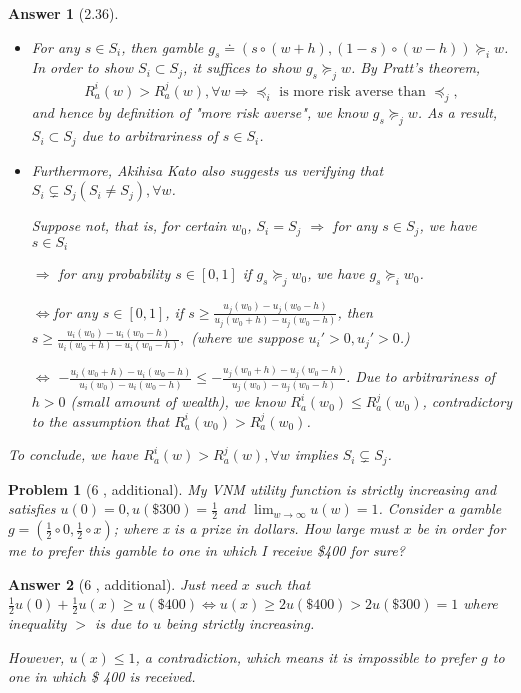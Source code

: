 \documentclass{article}
\newtheorem*{ans}{Answer}
\newtheorem*{prob}{{\bf Problem}}
\newcommand{\1}{{\bf 1}}
\newcommand{\0}{{\mathbf{0}}}
\newcommand{\<}{\langle}
\renewcommand{\>}{\rangle}
\newcommand{\dps}{\displaystyle}
\begin{document}
\begin{ans}[2.36] 
	\begin{itemize}
		\item For any $s \in S_i$, then gamble $g_s \doteq \left( s\circ (w+h), (1-s)\circ (w-h) \right) \succeq_i w$. In order to show $S_i \subset S_j$, it suffices to show $g_s \succeq_j w$. By Pratt's theorem, 
	$$R_a^i(w) > R_a^j(w), \forall w \Rightarrow \preceq_i\text{ is more risk averse than }\preceq_j,$$
	and hence by definition of "more risk averse", we know $g_s \succeq_j w$. As a result, $S_i \subset S_j$ due to arbitrariness of $s \in S_i$.
	
	\item Furthermore, Akihisa Kato also suggests us verifying that $S_i \subsetneq S_j (S_i \ne  S_j),\forall w$.
	
	Suppose not, that is, for certain $w_0$, $S_i = S_j $ $\Rightarrow $ for any $s \in S_j$, we have $s \in S_i $
	
	 $\Rightarrow $ for any probability $s \in[0,1]$ if $g_s \succeq_j w_0$, we have $g_s \succeq_i w_0$.
	 
	 $\Leftrightarrow $for any $s \in[0,1]$, if $s \ge \frac{u_j(w_0 ) - u_j(w_0 -h)}{u_j(w_0+h) - u_j(w_0 -h)}$, then $s\ge \frac{u_i(w_0 ) - u_i(w_0 -h)}{u_i(w_0+h) - u_i(w_0 -h)},$
	 (where we suppose $u_i'>0,u_j'>0$.)
	 
	 	 $\Leftrightarrow $  $     -  \frac{u_i(w_0+h) - u_i(w_0 -h)}{u_i(w_0 ) - u_i(w_0 -h)} \le  - \frac{u_j(w_0+h) - u_j(w_0 -h)}{u_j(w_0 ) - u_j(w_0 -h)}$. Due to arbitrariness of $h>0$ (small amount of wealth), we know $R^i_a(w_0 )\le R^j_a(w_0)$, contradictory to the assumption that $R^i_a(w_0 )>  R^j_a(w_0)$.
	\end{itemize}

To conclude, we have  $R^i_a(w) > R^j_a(w), \forall w$ implies $S_i \subsetneq S_j$.
	
\end{ans}
\begin{prob}[6 , additional] My VNM utility function is strictly increasing and satisfies $ u(0) = 0, u(\$300) = \frac12$
	and $ \dps \lim_{w \to \infty} u(w) = 1$. Consider a gamble $g = \left( \frac12\circ 0, \frac12 \circ x \right)$; where x is a prize in
	dollars. How large must $x$ be in order for me to prefer this gamble to one in which I receive \$400 for sure?
\end{prob}

\begin{ans}[6 , additional] Just need $x$ such that $\frac12 u(0) + \frac12 u(x) \ge u(\$ 400) \Leftrightarrow  u(x) \ge 2 u(\$ 400) > 2 u(\$ 300) = 1$ where inequality $>$ is due to $u$ being strictly increasing.
	
	However, $u(x) \le 1$, a contradiction, which means it is impossible to prefer $g$ to one in which \$ 400 is received.
\end{ans}
\end{document}
